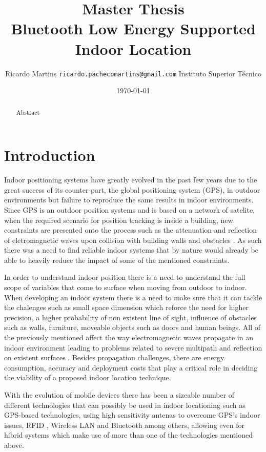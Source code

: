 \documentclass[a4paper]{IEEEtran}
\title{{ \normalsize Master Thesis} \\
	Bluetooth Low Energy Supported Indoor Location}
\author{
	Ricardo Martins {\tt ricardo.pachecomartins@gmail.com}
	Instituto Superior T\'{e}cnico}
\date{\today}
\begin{document}
\maketitle

\begin{abstract}

	Abstract

\end{abstract}

\section{Introduction}
\label{sec:Introduction}

Indoor positioning systems have greatly evolved in the past few years due to the great success of its counter-part, the global positioning system (GPS), in outdoor environments but failure to reproduce the same results in indoor environments. Since GPS is an outdoor position systems and is based on a network of satelite, when the required scenario for position tracking is inside a building, new constraints are presented onto the process such as the attenuation and reflection of eletromagnetic waves upon collision with building walls and obstacles \cite{survey1}. As such there was a need to find reliable indoor systems that by nature would already be able to heavily reduce the impact of some of the mentioned constraints.

In order to understand indoor position there is a need to understand the full scope of variables that come to surface when moving from outdoor to indoor. When developing an indoor system there is a need to make sure that it can tackle the chalenges such as small space dimension which reforce the need for higher precision, a higher probability of non existent line of sight, influence of obstacles such as walls, furniture, moveable objects such as doors and human beings\cite{reviewtechniques}. All of the previously mentioned affect the way electromagnetic waves propagate in an indoor environment leading to problems related to severe multipath and reflection on existent surfaces \cite{surveywireless}. Besides propagation challenges, there are energy consumption, accuracy and deployment costs that play a critical role in deciding the viability of a proposed indoor location technique.

With the evolution of mobile devices there has been a sizeable number of different technologies that can possibly be used in indoor locationing \cite{surveywireless,survey2,survey1} such as GPS-based technologies, using high sensitivity antenas to overcome GPS's indoor issues, RFID , Wireless LAN and Bluetooth among others, allowing even for hibrid systems which make use of more than one of the technologies mentioned above. 
\end{document}
